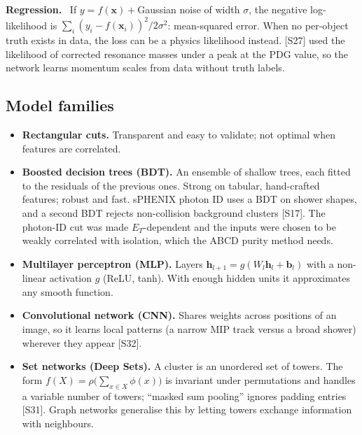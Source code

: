 \documentclass[11pt,letterpaper]{article}
\newcommand{\hd}[1]{\par\smallskip\noindent\textbf{\color{blue!50!black}#1.}\ }
\begin{document}
\hd{Regression} If $y=f(\mathbf x)+$Gaussian noise of width $\sigma$, the negative log-likelihood is $\sum_i(y_i-f(\mathbf x_i))^2/2\sigma^2$:
mean-squared error. When no per-object truth exists in data, the loss can be a physics likelihood instead. [S27] used the likelihood of
corrected resonance masses under a peak at the PDG value, so the network learns momentum scales from data without truth labels.

\subsection{Model families}
\begin{itemize}
\item \textbf{Rectangular cuts.} Transparent and easy to validate; not optimal when features are correlated.
\item \textbf{Boosted decision trees (BDT).} An ensemble of shallow trees, each fitted to the residuals of the previous ones. Strong on
tabular, hand-crafted features; robust and fast. sPHENIX photon ID uses a BDT on shower shapes, and a second BDT rejects
non-collision background clusters [S17]. The photon-ID cut was made $E_T$-dependent and the inputs were chosen to be weakly correlated
with isolation, which the ABCD purity method needs.
\item \textbf{Multilayer perceptron (MLP).} Layers $\mathbf h_{l+1}=g(W_l\mathbf h_l+\mathbf b_l)$ with a non-linear activation $g$
(ReLU, tanh). With enough hidden units it approximates any smooth function.
\item \textbf{Convolutional network (CNN).} Shares weights across positions of an image, so it learns local patterns (a narrow MIP track
versus a broad shower) wherever they appear [S32].
\item \textbf{Set networks (Deep Sets).} A cluster is an unordered set of towers. The form $f(X)=\rho\big(\sum_{x\in X}\phi(x)\big)$ is
invariant under permutations and handles a variable number of towers; ``masked sum pooling'' ignores padding entries [S31]. Graph
networks generalise this by letting towers exchange information with neighbours.
\end{itemize}
\end{document}
